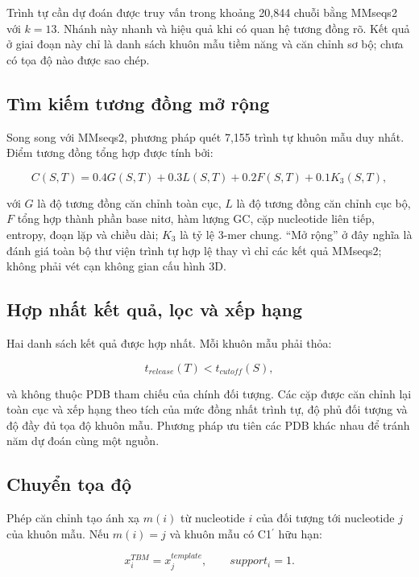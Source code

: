 \documentclass[12pt,a4paper,oneside]{report}
\newcommand{\cprime}{C1$^{\prime}$}
\begin{document}
Trình tự cần dự đoán được truy vấn trong khoảng 20,844 chuỗi bằng MMseqs2 với $k=13$.
Nhánh này nhanh và hiệu quả khi có quan hệ tương đồng rõ. Kết quả ở giai đoạn này chỉ
là danh sách khuôn mẫu tiềm năng và căn chỉnh sơ bộ; chưa có tọa độ nào được sao chép.

\subsection{Tìm kiếm tương đồng mở rộng}

Song song với MMseqs2, phương pháp quét 7,155 trình tự khuôn mẫu duy nhất. Điểm tương
đồng tổng hợp được tính bởi:

\begin{equation}
C(S,T)=0.4G(S,T)+0.3L(S,T)+0.2F(S,T)+0.1K_3(S,T),
\end{equation}

với $G$ là độ tương đồng căn chỉnh toàn cục, $L$ là độ tương đồng căn chỉnh cục bộ,
$F$ tổng hợp thành phần base nitơ, hàm lượng GC, cặp nucleotide liên tiếp, entropy, đoạn
lặp và chiều dài;
$K_3$ là tỷ lệ 3-mer chung. ``Mở rộng'' ở đây nghĩa là đánh giá toàn bộ thư viện trình
tự hợp lệ thay vì chỉ các kết quả MMseqs2; không phải vét cạn không gian cấu hình 3D.

\subsection{Hợp nhất kết quả, lọc và xếp hạng}

Hai danh sách kết quả được hợp nhất. Mỗi khuôn mẫu phải thỏa:

\begin{equation}
t_{release}(T)<t_{cutoff}(S),
\end{equation}

và không thuộc PDB tham chiếu của chính đối tượng. Các cặp được căn chỉnh lại toàn cục
và xếp hạng theo tích của mức đồng nhất trình tự, độ phủ đối tượng và độ đầy đủ tọa độ
khuôn mẫu. Phương pháp ưu tiên các PDB khác nhau để tránh năm dự đoán cùng một nguồn.

\subsection{Chuyển tọa độ}

Phép căn chỉnh tạo ánh xạ $m(i)$ từ nucleotide $i$ của đối tượng tới nucleotide $j$
của khuôn mẫu. Nếu $m(i)=j$ và khuôn mẫu có \cprime{} hữu hạn:

\begin{equation}
x_i^{TBM}=x_j^{template},\qquad support_i=1.
\end{equation}
\end{document}
